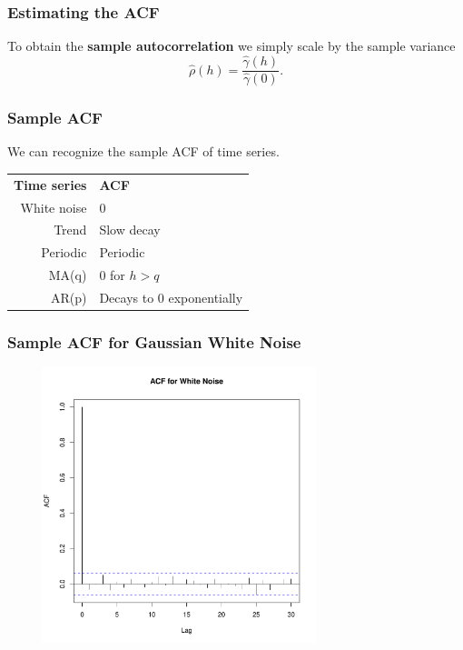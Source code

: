 \documentclass[%
xcolor=pdftex]{beamer}
\begin{document}
\begin{frame}
\frametitle{Estimating the ACF}

To obtain the \textbf{sample autocorrelation} we simply scale by the sample variance
\begin{equation} \label{eq:samp2}
\hat{\rho}(h)=\frac{\hat{\gamma}(h)}{{\hat{\gamma}(0)}}.
\end{equation}


\end{frame}


\begin{frame}
\frametitle{Sample ACF}

We can recognize the sample ACF of time series.\\

\begin{center}
\begin{tabular}{ r l }
  \textbf{Time series} & \textbf{ACF} \\
White noise & 0\\
Trend & Slow decay\\
Periodic & Periodic\\
MA(q) & 0 for $h>q$\\
AR(p) & Decays to 0 exponentially\\
\end{tabular}
\end{center}

\end{frame}

\begin{frame}
\frametitle{Sample ACF for Gaussian White Noise}

\includegraphics[width=100mm, height=80mm]{pics/acf_wn.pdf}

\end{frame}
\end{document}
